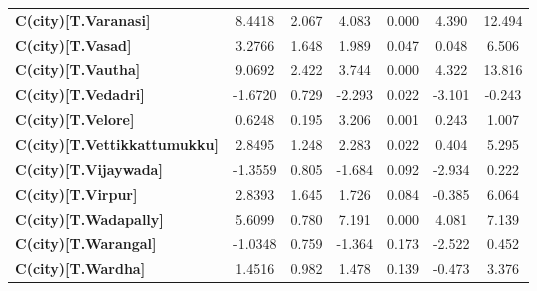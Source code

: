 \begin{center}
\begin{tabular}{lcccccc}
\textbf{C(city)[T.Varanasi]}                                                                        &       8.4418  &        2.067     &     4.083  &         0.000        &        4.390    &       12.494     \\
\textbf{C(city)[T.Vasad]}                                                                           &       3.2766  &        1.648     &     1.989  &         0.047        &        0.048    &        6.506     \\
\textbf{C(city)[T.Vautha]}                                                                          &       9.0692  &        2.422     &     3.744  &         0.000        &        4.322    &       13.816     \\
\textbf{C(city)[T.Vedadri]}                                                                         &      -1.6720  &        0.729     &    -2.293  &         0.022        &       -3.101    &       -0.243     \\
\textbf{C(city)[T.Velore]}                                                                          &       0.6248  &        0.195     &     3.206  &         0.001        &        0.243    &        1.007     \\
\textbf{C(city)[T.Vettikkattumukku]}                                                                &       2.8495  &        1.248     &     2.283  &         0.022        &        0.404    &        5.295     \\
\textbf{C(city)[T.Vijaywada]}                                                                       &      -1.3559  &        0.805     &    -1.684  &         0.092        &       -2.934    &        0.222     \\
\textbf{C(city)[T.Virpur]}                                                                          &       2.8393  &        1.645     &     1.726  &         0.084        &       -0.385    &        6.064     \\
\textbf{C(city)[T.Wadapally]}                                                                       &       5.6099  &        0.780     &     7.191  &         0.000        &        4.081    &        7.139     \\
\textbf{C(city)[T.Warangal]}                                                                        &      -1.0348  &        0.759     &    -1.364  &         0.173        &       -2.522    &        0.452     \\
\textbf{C(city)[T.Wardha]}                                                                          &       1.4516  &        0.982     &     1.478  &         0.139        &       -0.473    &        3.376     \\

\end{tabular}
\end{center}
